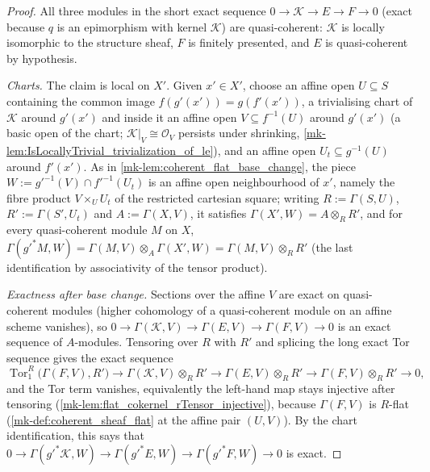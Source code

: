 \begin{proof}
  \leanok
  All three modules in the short exact sequence
  \(0 \to \mathcal K \to E \to F \to 0\) (exact because \(q\) is an
  epimorphism with kernel \(\mathcal K\)) are quasi-coherent: \(\mathcal K\)
  is locally isomorphic to the structure sheaf, \(F\) is finitely presented,
  and \(E\) is quasi-coherent by hypothesis.

  \emph{Charts.}  The claim is local on \(X'\).  Given \(x' \in X'\), choose
  an affine open \(U \subseteq S\) containing the common image
  \(f(g'(x')) = g(f'(x'))\), a trivialising chart of \(\mathcal K\) around
  \(g'(x')\) and inside it an affine open \(V \subseteq f^{-1}(U)\) around
  \(g'(x')\) (a basic open of the chart; \(\mathcal K|_V \cong \mathcal
  O_V\) persists under shrinking,
  \ref{mk-lem:IsLocallyTrivial_trivialization_of_le}), and an affine open
  \(U_t \subseteq g^{-1}(U)\) around \(f'(x')\).  As in
  \ref{mk-lem:coherent_flat_base_change}, the piece
  \(W := g'^{-1}(V) \cap f'^{-1}(U_t)\) is an affine open neighbourhood of
  \(x'\), namely the fibre product \(V \times_U U_t\) of the restricted
  cartesian square; writing \(R := \Gamma(S, U)\),
  \(R' := \Gamma(S', U_t)\) and \(A := \Gamma(X, V)\), it satisfies
  \(\Gamma(X', W) = A \otimes_R R'\), and for every quasi-coherent module
  \(M\) on \(X\),
  \(\Gamma(g'^* M, W) = \Gamma(M, V) \otimes_A \Gamma(X', W)
    = \Gamma(M, V) \otimes_R R'\)
  (the last identification by associativity of the tensor product).

  \emph{Exactness after base change.}  Sections over the affine \(V\) are
  exact on quasi-coherent modules (higher cohomology of a quasi-coherent
  module on an affine scheme vanishes), so
  \(0 \to \Gamma(\mathcal K, V) \to \Gamma(E, V) \to \Gamma(F, V) \to 0\)
  is an exact sequence of \(A\)-modules.  Tensoring over \(R\) with \(R'\)
  and splicing the long exact Tor sequence gives the exact sequence
  \[
    \operatorname{Tor}_1^R\bigl(\Gamma(F, V), R'\bigr)
      \to \Gamma(\mathcal K, V) \otimes_R R'
      \to \Gamma(E, V) \otimes_R R'
      \to \Gamma(F, V) \otimes_R R'
      \to 0,
  \]
  and the Tor term vanishes, equivalently the left-hand map stays injective
  after tensoring (\ref{mk-lem:flat_cokernel_rTensor_injective}), because
  \(\Gamma(F, V)\) is \(R\)-flat (\ref{mk-def:coherent_sheaf_flat} at the
  affine pair \((U, V)\)).  By the chart identification, this says that
  \(0 \to \Gamma(g'^* \mathcal K, W) \to \Gamma(g'^* E, W)
    \to \Gamma(g'^* F, W) \to 0\)
  is exact.


\end{proof}
